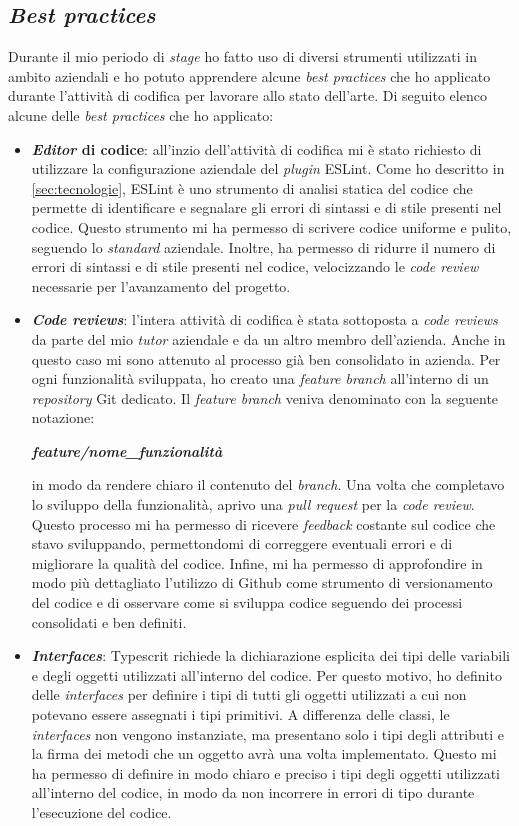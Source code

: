 \subsection{\textit{Best practices}}
Durante il mio periodo di \textit{stage} ho fatto uso di diversi strumenti utilizzati in ambito aziendali e ho potuto apprendere alcune \textit{best practices} che ho applicato durante l'attività di codifica per lavorare allo stato dell'arte. Di seguito elenco alcune delle \textit{best practices} che ho applicato:
\begin{itemize}
    \item \textbf{\textit{Editor} di codice}: all'inzio dell'attività di codifica mi è stato richiesto di utilizzare la configurazione aziendale del \textit{plugin} ESLint. Come ho descritto in \ref{sec:tecnologie}, ESLint è uno strumento di analisi statica del codice che permette di identificare e segnalare gli errori di sintassi e di stile presenti nel codice.  Questo strumento mi ha permesso di scrivere codice uniforme e pulito, seguendo lo \textit{standard} aziendale. Inoltre, ha permesso di ridurre il numero di errori di sintassi e di stile presenti nel codice, velocizzando le \textit{code review} necessarie per l'avanzamento del progetto.
    \item \textbf{\textit{Code reviews}}: l'intera attività di codifica è stata sottoposta a \textit{code reviews} da parte del mio \textit{tutor} aziendale e da un altro membro dell'azienda. Anche in questo caso mi sono attenuto al processo già ben consolidato in azienda. Per ogni funzionalità sviluppata, ho creato una \textit{feature branch} all'interno di un \textit{repository} Git dedicato. Il \textit{feature branch} veniva denominato con la seguente notazione:
    \begin{center}
        \textbf{\emph{feature/nome\_funzionalità}}
    \end{center}
    in modo da rendere chiaro il contenuto del \textit{branch}. Una volta che completavo lo sviluppo della funzionalità, aprivo una \textit{pull request} per la \textit{code review}. Questo processo mi ha permesso di ricevere \textit{feedback} costante sul codice che stavo sviluppando, permettondomi di correggere eventuali errori e di migliorare la qualità del codice. Infine, mi ha permesso di approfondire in modo più dettagliato l'utilizzo di Github come strumento di versionamento del codice e di osservare come si sviluppa codice seguendo dei processi consolidati e ben definiti.
    \item \textbf{\textit{Interfaces}}: Typescrit richiede la dichiarazione esplicita dei tipi delle variabili e degli oggetti utilizzati all'interno del codice. Per questo motivo, ho definito delle \textit{interfaces} per definire i tipi di tutti gli oggetti utilizzati a cui non potevano essere assegnati i tipi primitivi. A differenza delle classi, le \textit{interfaces} non vengono instanziate, ma presentano solo i tipi degli attributi e la firma dei metodi che un oggetto avrà una volta implementato. Questo mi ha permesso di definire in modo chiaro e preciso i tipi degli oggetti utilizzati all'interno del codice, in modo da non incorrere in errori di tipo durante l'esecuzione del codice.

\end{itemize}
